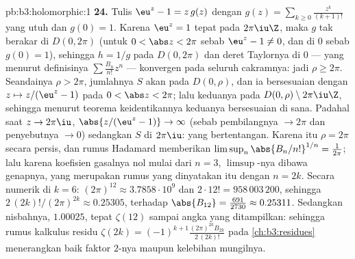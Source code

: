 \begin{solution}{pb:b3:holomorphic:1}
\textbf{24.} Tulis $\eu^z - 1 = z\,g(z)$ dengan $g(z) =
\sum_{k\geq0}\frac{z^k}{(k+1)!}$ yang utuh dan $g(0) = 1$. Karena
$\eu^z = 1$ tepat pada $2\pi\iu\Z$, maka $g$ tak berakar di
$D(0, 2\pi)$ (untuk $0 < \abs z < 2\pi$ sebab $\eu^z - 1
\neq 0$, dan di $0$ sebab $g(0) = 1$), sehingga $h = 1/g$ 
pada $D(0,2\pi)$ dan deret Taylornya di $0$ --- yang menurut
definisinya $\sum\frac{B_n}{n!}z^n$ --- konvergen pada
seluruh cakramnya: jadi $\rho \geq 2\pi$. Seandainya $\rho > 2\pi$, jumlahnya $S$
akan  pada $D(0,\rho)$, dan ia bersesuaian dengan $z
\mapsto z/(\eu^z - 1)$ pada $0 < \abs z < 2\pi$; lalu keduanya
 pada   $D(0,\rho) \setminus
2\pi\iu\Z$, sehingga menurut teorema keidentikannya keduanya bersesuaian di sana. Padahal
saat $z \to 2\pi\iu$, $\abs{z/(\eu^z - 1)} \to \infty$
(sebab pembilangnya $\to 2\pi$ dan penyebutnya $\to 0$) sedangkan $S$
 di $2\pi\iu$: yang bertentangan. Karena itu $\rho = 2\pi$
secara persis, dan rumus Hadamard memberikan
$\limsup_n\abs{B_n/n!}^{1/n} = \frac1{2\pi}$; lalu karena koefisien
gasalnya nol mulai dari $n = 3$, $\limsup$-nya dibawa
 genapnya, yang merupakan rumus yang dinyatakan itu
dengan $n = 2k$. Secara numerik di $k = 6$: $(2\pi)^{12} \approx
3.7858\cdot10^9$ dan $2\cdot12! = 958\,003\,200$, sehingga
$2\,(2k)!/(2\pi)^{2k} \approx 0.25305$, terhadap
$\abs{B_{12}} = \frac{691}{2730} \approx 0.25311$. Sedangkan
nisbahnya, $1.00025$, tepat $\zeta(12)$ sampai angka yang
ditampilkan: sehingga rumus kalkulus residu $\zeta(2k) =
(-1)^{k+1}\frac{(2\pi)^{2k}B_{2k}}{2\,(2k)!}$ pada
\cref{ch:b3:residues} menerangkan baik faktor $2$-nya maupun
kelebihan mungilnya.


\end{solution}
